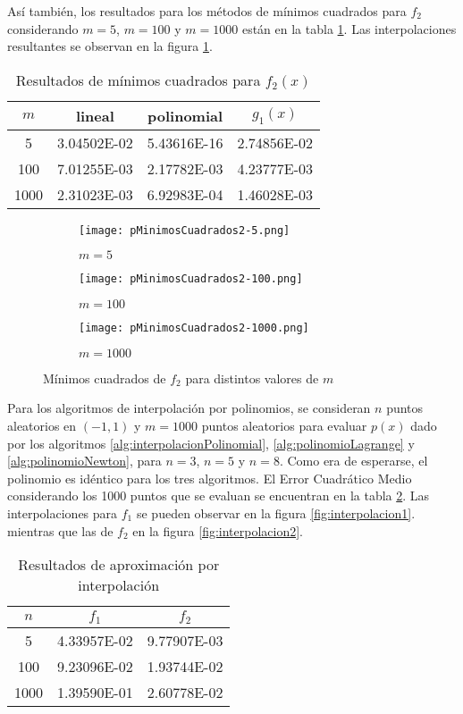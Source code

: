 Así también, los resultados para los métodos de mínimos cuadrados para $f_2$ considerando $m=5$, $m=100$ y $m=1000$ están en la tabla \ref{tab:minimosCuadrados2}. Las interpolaciones resultantes se observan en la figura \ref{fig:minimosCuadrados2}.\par
\begin{table}[H]
\centering
\begin{tabular}{|c|c|c|c|}
\hline
$m$  & lineal      & polinomial  & $g_1(x)$    \\ \hline
5    & 3.04502E-02 & 5.43616E-16 & 2.74856E-02 \\ \hline
100  & 7.01255E-03 & 2.17782E-03 & 4.23777E-03 \\ \hline
1000 & 2.31023E-03 & 6.92983E-04 & 1.46028E-03 \\ \hline
\end{tabular}
\caption{Resultados de mínimos cuadrados para $f_2(x)$}
\label{tab:minimosCuadrados2}
\end{table}
\begin{figure}[H]
\centering
\begin{subfigure}[b]{0.3\textwidth}
	\centering
	\texttt{[image: pMinimosCuadrados2-5.png]}
	\caption{$m=5$}
\end{subfigure}
\hfill
\begin{subfigure}[b]{0.3\textwidth}
	\centering
	\texttt{[image: pMinimosCuadrados2-100.png]}
	\caption{$m=100$}
\end{subfigure}
\hfill
\begin{subfigure}[b]{0.3\textwidth}
	\centering
	\texttt{[image: pMinimosCuadrados2-1000.png]}
	\caption{$m=1000$}
\end{subfigure}
\caption{Mínimos cuadrados de $f_2$ para distintos valores de $m$}
\label{fig:minimosCuadrados2}
\end{figure}
Para los algoritmos de interpolación por polinomios, se consideran $n$ puntos aleatorios en $(-1,1)$ y $m=1000$ puntos aleatorios para evaluar $p(x)$ dado por los algoritmos \ref{alg:interpolacionPolinomial}, \ref{alg:polinomioLagrange} y \ref{alg:polinomioNewton}, para $n=3$, $n=5$ y $n=8$. Como era de esperarse, el polinomio es idéntico para los tres algoritmos. El Error Cuadrático Medio considerando los 1000 puntos que se evaluan se encuentran en la tabla \ref{tab:interpolacion}. Las interpolaciones para $f_1$ se pueden observar en la figura \ref{fig:interpolacion1}. mientras que las de $f_2$ en la figura \ref{fig:interpolacion2}.
\begin{table}[H]
\centering
\begin{tabular}{|c|c|c|}
\hline
$n$  & $f_1$       & $f_2$       \\ \hline
5    & 4.33957E-02 & 9.77907E-03 \\ \hline
100  & 9.23096E-02 & 1.93744E-02 \\ \hline
1000 & 1.39590E-01 & 2.60778E-02 \\ \hline
\end{tabular}
\caption{Resultados de aproximación por interpolación}
\label{tab:interpolacion}
\end{table}
